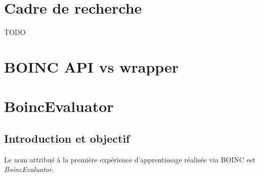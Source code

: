 \documentclass[a4paper, 11pt]{report}
\begin{document}
\section{Cadre de recherche}
TODO

\section{BOINC API vs wrapper}


\section{BoincEvaluator}
\subsection{Introduction et objectif}
Le nom attribué à la première expérience d'apprentissage réalisée via \textsc{BOINC} est \textit{BoincEvaluator}.
\end{document}
